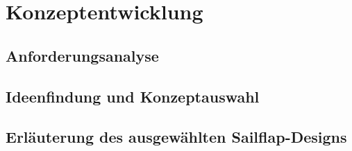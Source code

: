 
\chapter{Konzeptentwicklung }
\label{chap:konzeptentwicklung}


\section{Anforderungsanalyse}
\section{Ideenfindung und Konzeptauswahl}
\section{Erläuterung des ausgewählten Sailflap-Designs}